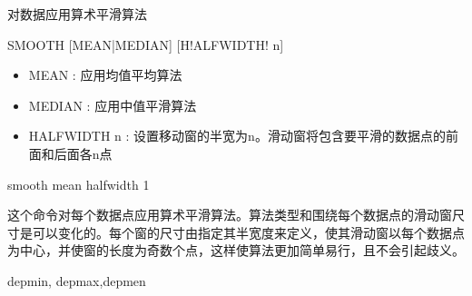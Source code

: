 \label{cmd:smooth}

对数据应用算术平滑算法

\begin{SACSTX}
SMOOTH [MEAN|MEDIAN] [H!ALFWIDTH! n]
\end{SACSTX}

\begin{itemize}
\item MEAN : 应用均值平均算法 
\item MEDIAN : 应用中值平滑算法 
\item HALFWIDTH n : 设置移动窗的半宽为n。滑动窗将包含要平滑的数据点的前面和后面各n点 
\end{itemize}

\begin{SACDFT}
smooth mean halfwidth 1
\end{SACDFT}

这个命令对每个数据点应用算术平滑算法。算法类型和围绕每个数据点的滑动窗尺寸是可以变化的。每个窗的尺寸由指定其半宽度来定义，使其滑动窗以每个数据点为中心，并使窗的长度为奇数个点，这样使算法更加简单易行，且不会引起歧义。

depmin, depmax,depmen
